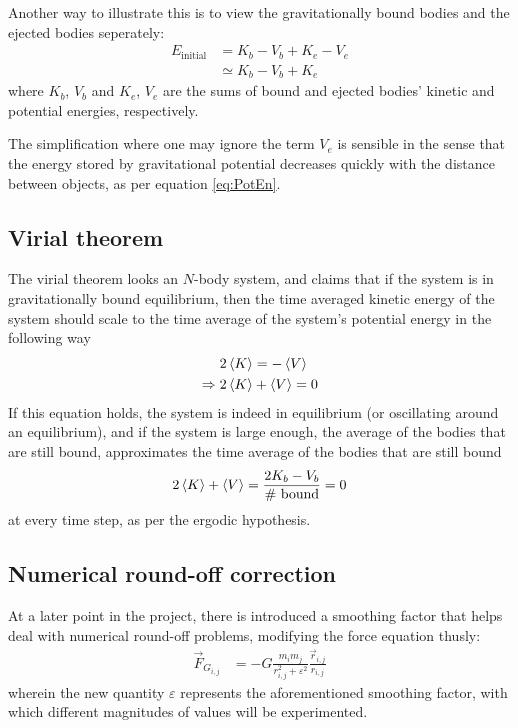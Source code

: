 \documentclass[11pt,a4paper,notitlepage,twocolumn]{article}
\begin{document}
Another way to illustrate this is to view the gravitationally bound bodies and the ejected bodies seperately:
\begin{align}
E_{\text{initial}} &= K_b - V_b + K_e - V_e \nonumber \\
&\simeq K_b - V_b + K_e 
\end{align}
where $K_b$, $V_b$ and $K_e$, $V_e$ are the sums of bound and ejected bodies' kinetic and potential energies, respectively.

The simplification where one may ignore the term $V_e$ is sensible in the sense that the energy stored by gravitational potential decreases quickly with the distance between objects, as per equation \ref{eq:PotEn}.

\subsection{Virial theorem}
The virial theorem looks an $N$-body system, and claims that if the system is in gravitationally bound equilibrium, then the time averaged kinetic energy of the system should scale to the time average of the system's potential energy in the following way
\begin{align}
2\braket{K} &= -\braket{V} \nonumber \\
\Rightarrow 2\braket{K} &+ \braket{V} = 0\nonumber
\end{align}
If this equation holds, the system is indeed in equilibrium (or oscillating around an equilibrium), and if the system is large enough, the average of the bodies that are still bound, approximates the time average of the bodies that are still bound
\begin{align}
2\braket{K} + \braket{V} = \frac{2 K_b - V_b}{\text{\# bound}} = 0
\label{eq:virial}
\end{align}
at every time step, as per the ergodic hypothesis.


\subsection{Numerical round-off correction}\label{section:matheps}
At a later point in the project, there is introduced a smoothing factor that helps deal with numerical round-off problems, modifying the force equation thusly:
\begin{align}\label{eq:modgravlaw}
\vec{F}_{G_{i,j}} &= -G\frac{m_i m_j}{r^2_{i,j}+\varepsilon^2}\frac{\vec{r}_{i,j}}{r_{i,j}}
\end{align}
wherein the new quantity $\varepsilon$ represents the aforementioned smoothing factor, with which different magnitudes of values will be experimented.
\end{document}
